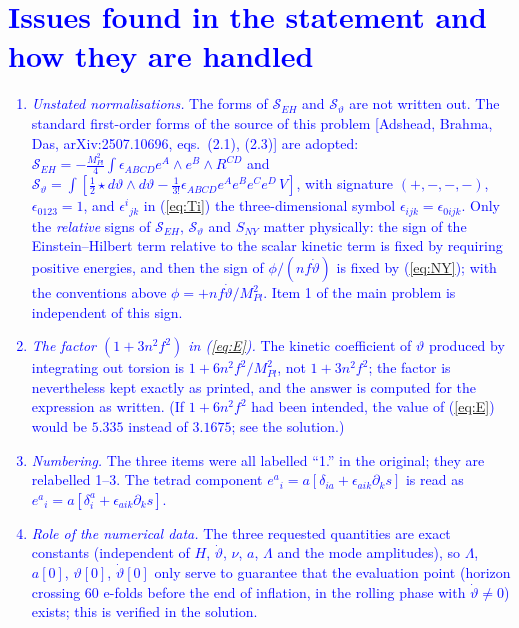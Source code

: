 \documentclass[11pt]{article}
\newcommand{\chg}[1]{\textcolor{blue}{#1}}
\begin{document}
\section*{\chg{Issues found in the statement and how they are handled}}
\chg{\begin{enumerate}
\item \emph{Unstated normalisations.} The forms of $\mathcal S_{EH}$ and $\mathcal S_\vartheta$ are not written out. The standard first-order forms of the source of this problem [Adshead, Brahma, Das, arXiv:2507.10696, eqs.\ (2.1), (2.3)] are adopted: $\mathcal S_{EH}=-\frac{M_{Pl}^2}{4}\int\epsilon_{ABCD}e^A\wedge e^B\wedge R^{CD}$ and $\mathcal S_\vartheta=\int[\frac12\star d\vartheta\wedge d\vartheta-\frac{1}{3!}\epsilon_{ABCD}e^Ae^Be^Ce^D\,V]$, with signature $(+,-,-,-)$, $\epsilon_{0123}=1$, and $\epsilon^i{}_{jk}$ in (\ref{eq:Ti}) the three-dimensional symbol $\epsilon_{ijk}=\epsilon_{0ijk}$. Only the \emph{relative} signs of $\mathcal S_{EH}$, $\mathcal S_\vartheta$ and $S_{NY}$ matter physically: the sign of the Einstein--Hilbert term relative to the scalar kinetic term is fixed by requiring positive energies, and then the sign of $\phi/(nf\dot\vartheta)$ is fixed by (\ref{eq:NY}); with the conventions above $\phi=+nf\dot\vartheta/M_{Pl}^2$. Item 1 of the main problem is independent of this sign.
\item \emph{The factor $(1+3n^2f^2)$ in (\ref{eq:E}).} The kinetic coefficient of $\vartheta$ produced by integrating out torsion is $1+6n^2f^2/M_{Pl}^2$, not $1+3n^2f^2$; the factor is nevertheless kept exactly as printed, and the answer is computed for the expression as written. (If $1+6n^2f^2$ had been intended, the value of (\ref{eq:E}) would be $5.335$ instead of $3.1675$; see the solution.)
\item \emph{Numbering.} The three items were all labelled ``1.'' in the original; they are relabelled 1--3. The tetrad component $e^a{}_i=a[\delta_{ia}+\epsilon_{aik}\partial_ks]$ is read as $e^a{}_i=a[\delta^a_i+\epsilon_{aik}\partial_ks]$.
\item \emph{Role of the numerical data.} The three requested quantities are exact constants (independent of $H$, $\dot\vartheta$, $\nu$, $a$, $\Lambda$ and the mode amplitudes), so $\Lambda$, $a[0]$, $\vartheta[0]$, $\dot\vartheta[0]$ only serve to guarantee that the evaluation point (horizon crossing 60 e-folds before the end of inflation, in the rolling phase with $\dot\vartheta\neq0$) exists; this is verified in the solution.
\end{enumerate}}
\end{document}
